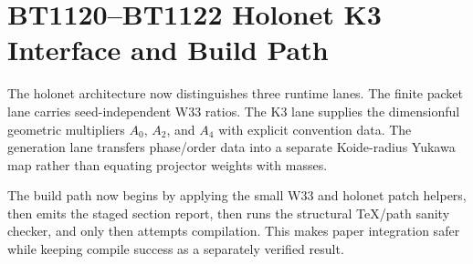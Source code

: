 \section{BT1120--BT1122 Holonet K3 Interface and Build Path}
\label{sec:bt1120-bt1122-holonet-k3-yukawa-build-path}

The holonet architecture now distinguishes three runtime lanes.  The finite packet lane carries seed-independent W33 ratios.  The K3 lane supplies the dimensionful geometric multipliers $A_0$, $A_2$, and $A_4$ with explicit convention data.  The generation lane transfers phase/order data into a separate Koide-radius Yukawa map rather than equating projector weights with masses.

The build path now begins by applying the small W33 and holonet patch helpers, then emits the staged section report, then runs the structural TeX/path sanity checker, and only then attempts compilation.  This makes paper integration safer while keeping compile success as a separately verified result.
